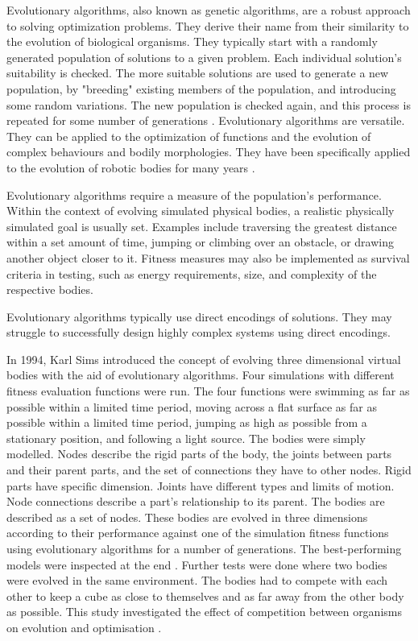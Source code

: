 Evolutionary algorithms, also known as genetic algorithms, are a robust approach to solving optimization problems. They derive their name from their similarity to the evolution of biological organisms. They typically start with a randomly generated population of solutions to a given problem. Each individual solution's suitability is checked. The more suitable solutions are used to generate a new population, by "breeding" existing members of the population, and introducing some random variations. The new population is checked again, and this process is repeated for some number of generations \cite{Groenwold1999}. Evolutionary algorithms are versatile. They can be applied to the optimization of functions and the evolution of complex behaviours and bodily morphologies. They have been specifically applied to the evolution of robotic bodies for many years \cite{Sims1994a,Sims1994b}.

Evolutionary algorithms require a measure of the population's performance. Within the context of evolving simulated physical bodies, a realistic physically simulated goal is usually set. Examples include traversing the greatest distance within a set amount of time, jumping or climbing over an obstacle, or drawing another object closer to it. Fitness measures may also be implemented as survival criteria in testing, such as energy requirements, size, and complexity of the respective bodies. \cite{Sims1994a, Sims1994b}

Evolutionary algorithms typically use direct encodings of solutions. They may struggle to successfully design highly complex systems using direct encodings. \cite{Hornby2001b}

In 1994, Karl Sims introduced the concept of evolving three dimensional virtual bodies with the aid of evolutionary algorithms. Four simulations with different fitness evaluation functions were run. The four functions were swimming as far as possible within a limited time period, moving across a flat surface as far as possible within a limited time period, jumping as high as possible from a stationary position, and following a light source. The bodies were simply modelled. Nodes describe the rigid parts of the body, the joints between parts and their parent parts, and the set of connections they have to other nodes. Rigid parts have specific dimension. Joints have different types and limits of motion. Node connections describe a part's relationship to its parent. The bodies are described as a set of nodes. These bodies are evolved in three dimensions according to their performance against one of the simulation fitness functions using evolutionary algorithms for a number of generations. The best-performing models were inspected at the end \cite{Sims1994a}. Further tests were done where two bodies were evolved in the same environment. The bodies had to compete with each other to keep a cube as close to themselves and as far away from the other body as possible. This study investigated the effect of competition between organisms on evolution and optimisation \cite{Sims1994b}.

